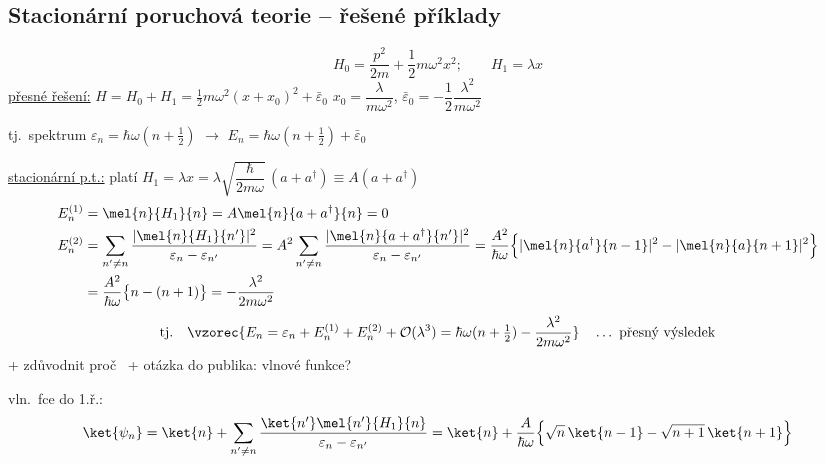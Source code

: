 \subsection{Stacionární poruchová teorie -- řešené příklady}

\begin{priklad}
\[
  H_0 = \frac{p^2}{2m} + \frac12 m\omega^2x^2; \qquad H_1 = \lambda x
\]
\underline{přesné řešení:} \quad $H = H_0 + H_1 = \frac12 m\omega^2(x + x_0)^2 + \bar\varepsilon_0$
\qquad $x_0 = \dfrac{\lambda}{m\omega^2}$, \quad $\bar\varepsilon_0 = -\dfrac12\dfrac{\lambda^2}{m\omega^2}$

tj.\ spektrum \quad $\varepsilon_n = \hbar\omega(n + \frac12)$ \quad $\longrightarrow$ \quad $E_n = \hbar\omega(n + \frac12) + \bar\varepsilon_0$

\underline{stacionární p.t.:} \quad platí \quad $H_1 = \lambda x = \lambda\sqrt{\dfrac{\hbar}{2m\omega}}\,(a + a^\dagger) \equiv A(a + a^\dagger)$
\begin{align*}
  E_n^{(1)} &= \mel{n}{H_1}{n} = A\mel{n}{a + a^\dagger}{n} = 0 \\
  E_n^{(2)} &= \sum_{n'\neq n}\frac{|\mel{n}{H_1}{n'}|^2}{\varepsilon_n - \varepsilon_{n'}}
   = A^2\sum_{n'\neq n}\frac{|\mel{n}{a + a^\dagger}{n'}|^2}{\varepsilon_n - \varepsilon_{n'}}
   = \frac{A^2}{\hbar\omega}\Big\{|\mel{n}{a^\dagger}{n-1}|^2 - |\mel{n}{a}{n+1}|^2\Big\} \\
  &= \frac{A^2}{\hbar\omega}\big\{n - (n+1)\big\} = -\frac{\lambda^2}{2m\omega^2}
\end{align*}
\[
  \text{tj.}\quad \vzorec{E_n = \varepsilon_n + E_n^{(1)} + E_n^{(2)} + \mathcal{O}(\lambda^3) = \hbar\omega(n + \tfrac12) - \frac{\lambda^2}{2m\omega^2}}
  \quad\dots\ \text{přesný výsledek}
\]
+ zdůvodnit proč \ + otázka do publika: vlnové funkce?

vln.\ fce do 1.ř.:
\[
  \ket{\psi_n} = \ket{n} + \sum_{n'\neq n}\frac{\ket{n'}\mel{n'}{H_1}{n}}{\varepsilon_n - \varepsilon_{n'}}
  = \ket{n} + \frac{A}{\hbar\omega}\Big\{\sqrt n\,\ket{n-1} - \sqrt{n+1}\,\ket{n+1}\Big\}
\]
\end{priklad}

